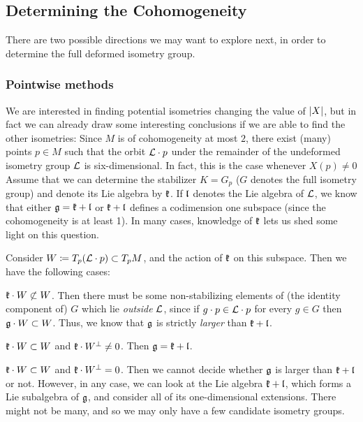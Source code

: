 \subsection{Determining the Cohomogeneity}

There are two possible directions we may want to explore next, in order to determine the full deformed isometry group.

\subsubsection{Pointwise methods}

We are interested in finding potential isometries changing the value of $\lvert X \rvert$, but in fact we can already draw some interesting conclusions if we are able to find the other isometries: Since $M$ is of cohomogeneity at most $2$, there exist (many) points $p\in M$ such that the orbit $\mathcal{L}\cdot p$ under the remainder of the undeformed isometry group $\mathcal{L}$ is six-dimensional. In fact, this is the case whenever $X(p)\neq 0$ 
Assume that we can determine the stabilizer $K=G_p$ ($G$ denotes the full isometry group) and denote its Lie algebra by $\mathfrak{k}$. If $\mathfrak{l}$ denotes the Lie algebra of $\mathcal{L}$, we know that either $\mathfrak{g}=\mathfrak{k} + \mathfrak{l}$ or $\mathfrak{k} + \mathfrak{l}$ defines a codimension one subspace (since the cohomogeneity is at least 1). In many cases, knowledge of $\mathfrak{k}$ lets us shed some light on this question.

Consider $W\coloneqq T_p (\mathcal{L}\cdot p)\subset T_p M$, and the action of $\mathfrak{k}$ on this subspace. Then we have the following cases:
\begin{numberedlist}
	\item $\mathfrak{k}\cdot W\not\subset W$. Then there must be some non-stabilizing elements of (the identity component of) $G$ which lie \emph{outside} $\mathcal{L}$, since if $g\cdot p\in \mathcal{L}\cdot p$ for every $g\in G$ then $\mathfrak{g}\cdot W\subset W$. Thus, we know that $\mathfrak{g}$ is strictly \emph{larger} than $\mathfrak{k} +\mathfrak{l}$.
	\item $\mathfrak{k}\cdot W\subset W$ and $\mathfrak{k} \cdot W^\perp \neq 0$. Then $\mathfrak{g}=\mathfrak{k} + \mathfrak{l}$.
	\item $\mathfrak{k} \cdot W\subset W$ and $\mathfrak{k} \cdot W^\perp=0$. Then we cannot decide whether $\mathfrak{g}$ is larger than $\mathfrak{k} +\mathfrak{l}$ or not. However, in any case, we can look at the Lie algebra $\mathfrak{k} +\mathfrak{l}$, which forms a Lie subalgebra of $\mathfrak{g}$, and consider all of its one-dimensional extensions. There might not be many, and so we may only have a few candidate isometry groups.
\end{numberedlist}

